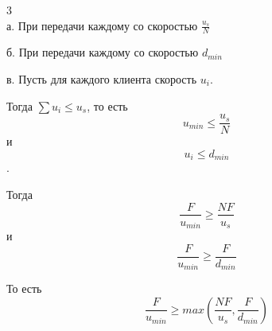 \documentclass[a4paper,11pt]{article}
\begin{document}
3
\\

а. При передачи каждому со скоростью $\frac{u_s}{N}$

б. При передачи каждому со скоростью $d_{min}$

в. Пусть для каждого клиента скорость $u_i$. 

Тогда $\sum u_i \leq u_s$, то есть $$u_{min} \leq \frac{u_s}{N}$$ и $$u_i \leq d_{min}$$. 

Тогда $$\frac{F}{u_{min}} \geq \frac{NF}{u_s}$$ и $$\frac{F}{u_{min}} \geq \frac{F}{d_{min}}$$

То есть $$\frac{F}{u_{min}} \geq max(\frac{NF}{u_s}, \frac{F}{d_{min}})$$
\end{document}
